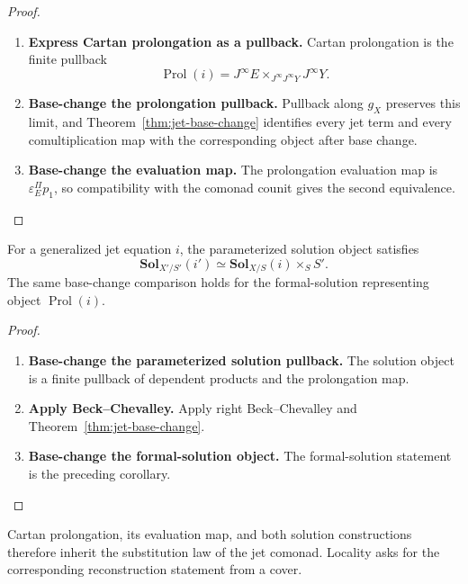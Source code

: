 \begin{proof}
\leavevmode
\begin{enumerate}[label=\textup{(\arabic*)}]
    \item \textbf{Express Cartan prolongation as a pullback.}
Cartan prolongation is the finite pullback
\[
  \operatorname{Prol}(i)
  =
  J^\infty E
  \times_{J^\infty J^\infty Y}
  J^\infty Y.
\]

    \item \textbf{Base-change the prolongation pullback.}
Pullback along \(g_X\) preserves this limit, and
Theorem~\ref{thm:jet-base-change} identifies every jet term and every
comultiplication map with the corresponding object after base change.

    \item \textbf{Base-change the evaluation map.}
The
prolongation evaluation map is \(\varepsilon^\Pi_Ep_1\), so compatibility with the comonad counit
gives the second equivalence.
\end{enumerate}
\end{proof}

\begin{corollary}
For a generalized jet equation \(i\), the parameterized solution object satisfies
\[
  \mathbf{Sol}_{X'/S'}(i')
  \simeq
  \mathbf{Sol}_{X/S}(i)\times_SS'.
\]
The same base-change comparison holds for the formal-solution representing
object \(\operatorname{Prol}(i)\).
\end{corollary}

\begin{proof}
\leavevmode
\begin{enumerate}[label=\textup{(\arabic*)}]
    \item \textbf{Base-change the parameterized solution pullback.}
The solution object is a finite pullback of dependent products and the
prolongation map.

    \item \textbf{Apply Beck--Chevalley.}
Apply right Beck--Chevalley and
Theorem~\ref{thm:jet-base-change}.

    \item \textbf{Base-change the formal-solution object.}
The formal-solution statement is the
preceding corollary.
\end{enumerate}
\end{proof}

Cartan prolongation, its evaluation map, and both solution constructions
therefore inherit the substitution law of the jet comonad. Locality asks for
the corresponding reconstruction statement from a cover.

